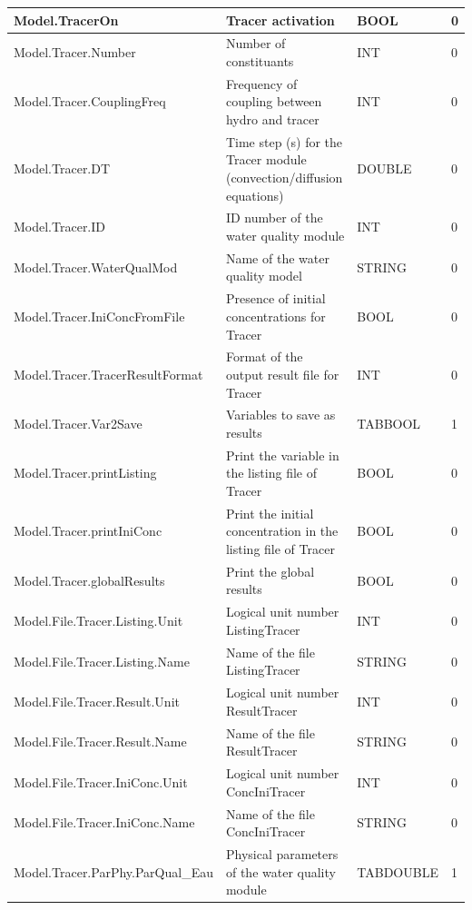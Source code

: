 \documentclass[a4paper,11pt]{article}
\begin{document}
\begin{landscape}
\begin{table}[ht]
\begin{center}
\begin{tabular}{|l|l|l|l|}
\hline Model.TracerOn & Tracer activation & BOOL & 0 \\
\hline Model.Tracer.Number & Number of constituants & INT & 0 \\
\hline Model.Tracer.CouplingFreq & Frequency of coupling between hydro and tracer & INT & 0 \\
\hline Model.Tracer.DT & Time step (s) for the Tracer module (convection/diffusion equations) & DOUBLE & 0 \\
\hline Model.Tracer.ID & ID number of the water quality module & INT & 0 \\
\hline Model.Tracer.WaterQualMod & Name of the water quality model & STRING & 0 \\
\hline Model.Tracer.IniConcFromFile & Presence of initial concentrations for Tracer & BOOL & 0 \\
\hline Model.Tracer.TracerResultFormat & Format of the output result file for Tracer & INT & 0 \\
\hline Model.Tracer.Var2Save & Variables to save as results & TABBOOL & 1 \\
\hline Model.Tracer.printListing & Print the variable in the listing file of Tracer & BOOL & 0 \\
\hline Model.Tracer.printIniConc & Print the initial concentration in the listing file of Tracer & BOOL & 0 \\
\hline Model.Tracer.globalResults & Print the global results & BOOL & 0 \\
\hline Model.File.Tracer.Listing.Unit & Logical unit number ListingTracer & INT & 0 \\
\hline Model.File.Tracer.Listing.Name & Name of the file ListingTracer & STRING & 0 \\
\hline Model.File.Tracer.Result.Unit & Logical unit number ResultTracer & INT & 0 \\
\hline Model.File.Tracer.Result.Name & Name of the file ResultTracer & STRING & 0 \\
\hline Model.File.Tracer.IniConc.Unit & Logical unit number ConcIniTracer & INT & 0 \\
\hline Model.File.Tracer.IniConc.Name & Name of the file ConcIniTracer
& STRING & 0 \\
\hline Model.Tracer.ParPhy.ParQual\_Eau & Physical parameters of the water quality module & TABDOUBLE & 1 \\

\hline 
\end{tabular} 
\end{center}
\end{table}


\end{landscape}
\end{document}
